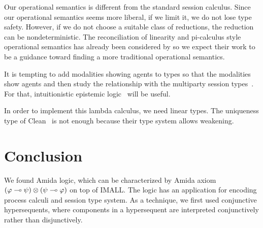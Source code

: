 Our operational semantics is different from the standard session
calculus.  Since our operational semantics seems more liberal,
if we limit it, we do not lose type safety.  However, if we do not
choose a suitable class of reductions, the reduction can be
nondeterministic.
The reconciliation of linearity and pi-calculus style operational
semantics has already been considered by
\citet{kobayashi-pierce-turner} so we expect their work to be a
guidance toward finding a more traditional operational semantics.

It is tempting to add modalities showing agents to types so that the
modalities show agents and then study the relationship with the
multiparty session types~\citep{sync-multi-session, async-multi-session}.
For that, intuitionistic epistemic logic~\citet{hirailpar,hiraimaster}
will be useful.

In order to implement this lambda calculus, we need linear types.
The uniqueness type of Clean~ is not enough because
their type system allows weakening.


\section{Conclusion}

We found Amida logic, which can be characterized by Amida axiom
$(\varphi\multimap\psi)\otimes(\psi\multimap\varphi)$ on top of IMALL.
The logic has an application for encoding process calculi and session type
system.
As a technique, we first used conjunctive hypersequents,
where components in a hypersequent are interpreted conjunctively rather
than disjunctively.